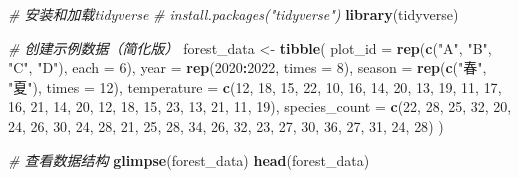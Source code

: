 \documentclass[
  twoside]{book}
\newenvironment{Shaded}{\begin{snugshade}}{\end{snugshade}}
\newcommand{\AttributeTok}[1]{\textcolor[rgb]{0.13,0.29,0.53}{#1}}
\newcommand{\CommentTok}[1]{\textcolor[rgb]{0.56,0.35,0.01}{\textit{#1}}}
\newcommand{\DecValTok}[1]{\textcolor[rgb]{0.00,0.00,0.81}{#1}}
\newcommand{\FunctionTok}[1]{\textcolor[rgb]{0.13,0.29,0.53}{\textbf{#1}}}
\newcommand{\NormalTok}[1]{#1}
\newcommand{\OtherTok}[1]{\textcolor[rgb]{0.56,0.35,0.01}{#1}}
\newcommand{\SpecialCharTok}[1]{\textcolor[rgb]{0.81,0.36,0.00}{\textbf{#1}}}
\newcommand{\StringTok}[1]{\textcolor[rgb]{0.31,0.60,0.02}{#1}}
\begin{document}
\begin{Shaded}
\begin{Highlighting}[]
\CommentTok{\# 安装和加载tidyverse}
\CommentTok{\# install.packages("tidyverse")}
\FunctionTok{library}\NormalTok{(tidyverse)}

\CommentTok{\# 创建示例数据（简化版）}
\NormalTok{forest\_data }\OtherTok{\textless{}{-}} \FunctionTok{tibble}\NormalTok{(}
  \AttributeTok{plot\_id =} \FunctionTok{rep}\NormalTok{(}\FunctionTok{c}\NormalTok{(}\StringTok{"A"}\NormalTok{, }\StringTok{"B"}\NormalTok{, }\StringTok{"C"}\NormalTok{, }\StringTok{"D"}\NormalTok{), }\AttributeTok{each =} \DecValTok{6}\NormalTok{),}
  \AttributeTok{year =} \FunctionTok{rep}\NormalTok{(}\DecValTok{2020}\SpecialCharTok{:}\DecValTok{2022}\NormalTok{, }\AttributeTok{times =} \DecValTok{8}\NormalTok{),}
  \AttributeTok{season =} \FunctionTok{rep}\NormalTok{(}\FunctionTok{c}\NormalTok{(}\StringTok{"春"}\NormalTok{, }\StringTok{"夏"}\NormalTok{), }\AttributeTok{times =} \DecValTok{12}\NormalTok{),}
  \AttributeTok{temperature =} \FunctionTok{c}\NormalTok{(}\DecValTok{12}\NormalTok{, }\DecValTok{18}\NormalTok{, }\DecValTok{15}\NormalTok{, }\DecValTok{22}\NormalTok{, }\DecValTok{10}\NormalTok{, }\DecValTok{16}\NormalTok{, }\DecValTok{14}\NormalTok{, }\DecValTok{20}\NormalTok{, }\DecValTok{13}\NormalTok{, }\DecValTok{19}\NormalTok{, }\DecValTok{11}\NormalTok{, }\DecValTok{17}\NormalTok{, }
                  \DecValTok{16}\NormalTok{, }\DecValTok{21}\NormalTok{, }\DecValTok{14}\NormalTok{, }\DecValTok{20}\NormalTok{, }\DecValTok{12}\NormalTok{, }\DecValTok{18}\NormalTok{, }\DecValTok{15}\NormalTok{, }\DecValTok{23}\NormalTok{, }\DecValTok{13}\NormalTok{, }\DecValTok{21}\NormalTok{, }\DecValTok{11}\NormalTok{, }\DecValTok{19}\NormalTok{),}
  \AttributeTok{species\_count =} \FunctionTok{c}\NormalTok{(}\DecValTok{22}\NormalTok{, }\DecValTok{28}\NormalTok{, }\DecValTok{25}\NormalTok{, }\DecValTok{32}\NormalTok{, }\DecValTok{20}\NormalTok{, }\DecValTok{24}\NormalTok{, }\DecValTok{26}\NormalTok{, }\DecValTok{30}\NormalTok{, }\DecValTok{24}\NormalTok{, }\DecValTok{28}\NormalTok{, }\DecValTok{21}\NormalTok{, }\DecValTok{25}\NormalTok{,}
                   \DecValTok{28}\NormalTok{, }\DecValTok{34}\NormalTok{, }\DecValTok{26}\NormalTok{, }\DecValTok{32}\NormalTok{, }\DecValTok{23}\NormalTok{, }\DecValTok{27}\NormalTok{, }\DecValTok{30}\NormalTok{, }\DecValTok{36}\NormalTok{, }\DecValTok{27}\NormalTok{, }\DecValTok{31}\NormalTok{, }\DecValTok{24}\NormalTok{, }\DecValTok{28}\NormalTok{)}
\NormalTok{)}

\CommentTok{\# 查看数据结构}
\FunctionTok{glimpse}\NormalTok{(forest\_data)}
\FunctionTok{head}\NormalTok{(forest\_data)}
\end{Highlighting}
\end{Shaded}
\end{document}
